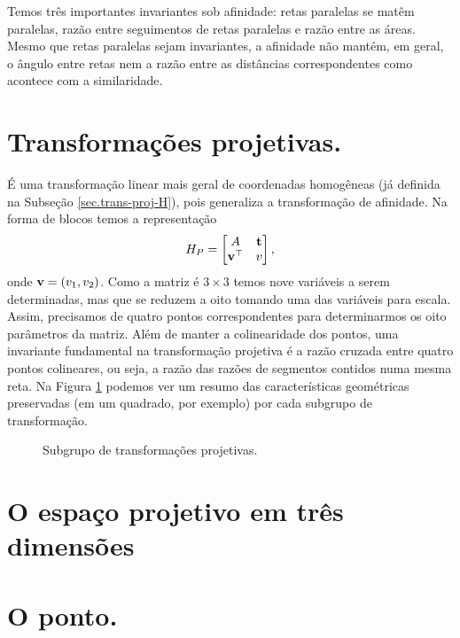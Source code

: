 Temos três importantes invariantes sob afinidade: retas paralelas se matêm paralelas, razão entre seguimentos de retas paralelas e razão entre as áreas. Mesmo que retas paralelas sejam invariantes, a afinidade não mantém, em geral, o ângulo entre retas nem a razão entre as distâncias correspondentes como acontece com a similaridade.
\section*{Transformações projetivas.}
É uma transformação linear mais geral de coordenadas homogêneas (já definida na Subseção \ref{sec.trans-proj-H}), pois generaliza  a transformação de afinidade. Na forma de blocos temos a representação
\begin{equation*}
H_P=
\begin{bmatrix}
A&{\bf t}\\
{\bf v}^\top&v
\end{bmatrix},
\end{equation*}
onde ${\bf v}=(v_1,v_2)$. Como a matriz é $3\times3$ temos nove variáveis a serem determinadas, mas que se reduzem a oito tomando uma das variáveis para escala. Assim, precisamos de quatro pontos correspondentes para determinarmos os oito parâmetros da matriz. Além de manter a colinearidade dos pontos, uma invariante fundamental na transformação projetiva é a razão cruzada entre quatro pontos colineares, ou seja, a razão das razões de segmentos contidos numa mesma reta. Na Figura \ref{fig.transformacoes-2D} podemos ver um resumo das características geométricas preservadas (em um quadrado, por exemplo) por cada subgrupo de transformação.
\begin{figure}[!htb]{\textwidth}
\caption{Subgrupo de transformações projetivas.}
\hfill
{}\hfill
{}\hfill
{}\hfill
{}
\label{fig.transformacoes-2D}
\end{figure}
\section{O espaço projetivo em três dimensões}\label{sec.espaco-P3}


\section*{O ponto.} 


